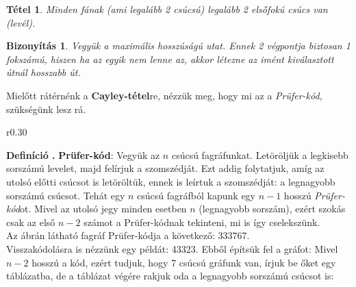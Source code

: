 \documentclass[a4paper,12pt,twoside]{book}
\newtheorem{defi}{Definíció}[chapter]
\newtheorem{tetel}{Tétel}[chapter]
\newtheorem{biz}{Bizonyítás}[chapter]
\theoremstyle{break}
\begin{document}
\begin{tetel}
 Minden fának (ami legalább 2 csúcsú) legalább 2 elsőfokú csúcs van (\textit{levél}).
\end{tetel}
\begin{biz}
 Vegyük a maximális hosszúságú utat. Ennek 2 végpontja biztosan 1 fokszámú, hiszen ha az egyik nem lenne az, akkor létezne az imént kiválasztott útnál hosszabb út.
\end{biz}

Mielőtt rátérnénk a \textbf{Cayley-tétel}re, nézzük meg, hogy mi az a \textit{Prüfer-kód}, szükségünk lesz rá.\\

\begin{wrapfigure}{r}{0.30\textwidth}
\vspace*{-25pt}
\begin{center}
\end{center}
\vspace*{-35pt}
\end{wrapfigure}

\textbf{Definíció .} \textbf{Prüfer-kód}: Vegyük az $n$ csúcsú fagráfunkat. Letöröljük a legkisebb sorszámú levelet, majd felírjuk a szomszédját. Ezt addig folytatjuk, amíg az utolsó előtti csúcsot is letöröltük, ennek is leírtuk a szomszédját: a legnagyobb sorszámú csúcsot. Tehát egy $n$ csúcsú fagráfból kapunk egy $n-1$ hosszú \textit{Prüfer-kód}ot. Mivel az utolsó jegy minden esetben $n$ (legnagyobb sorszám), ezért szokás csak az első $n-2$ számot a Prüfer-kódnak tekinteni, mi is így cselekszünk.\\

Az ábrán látható fagráf Prüfer-kódja a következő: 333767.\\ Visszakódolásra is nézzünk egy példát: 43323. Ebből építsük fel a gráfot: Mivel $n-2$ hosszú a kód, ezért tudjuk, hogy 7 csúcsú gráfunk van, írjuk be őket egy táblázatba, de a táblázat végére rakjuk oda a legnagyobb sorszámú csúcsot is:
\end{document}
